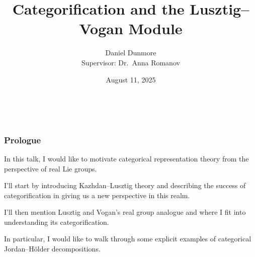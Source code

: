 \documentclass{beamer}
\title[{\fontsize{5.5}{4}\selectfont Categorification and the Lusztig--Vogan Module}]{Categorification and the Lusztig--Vogan Module}
\author[Daniel Dunmore]{
    Daniel Dunmore\\
    {\footnotesize Supervisor: Dr.\ Anna Romanov}
}
\institute[UNSW]{
	University of New South Wales \\
	\medskip
	\textit{d.dunmore@unsw.edu.au}
}
\date{August 11, 2025}
\begin{document}

\begin{frame}
\noindent\\[-20pt]
\begin{figure}[!ht]
\titlepage
\end{figure}
\end{frame}
\logo{}


\begin{frame}
\frametitle{Prologue}
\noindent In this talk, I would like to motivate categorical representation theory from the perspective of real Lie groups.\newline

\noindent I'll start by introducing Kazhdan--Lusztig theory and describing the success of categorification in giving us a new perspective in this realm.\newline

\noindent I'll then mention Lusztig and Vogan's real group analogue and where I fit into understanding its categorification.\newline

\noindent In particular, I would like to walk through some explicit examples of categorical Jordan--H\"{o}lder decompositions.
\end{frame}



\end{document}
